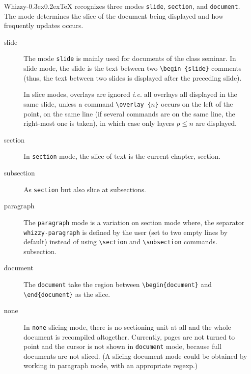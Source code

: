 \documentclass[12pt]{article}
\makeatletter
\let \lst \verb
\def \whizzy {{Whizzy\kern -0.3ex\raise 0.2ex\hbox{\let \@\relax\TeX}}}
\makeatother
\begin{document}
{\whizzy} recognizes three modes \lst"slide", \lst"section", and \lst"document". 
The mode determines the slice of the document being displayed and how
frequently updates occurs. 
\begin{description}

\item [slide]

The mode \lst"slide"  is mainly used for documents of the class seminar. 
In slide mode, the slide is the text between two \lst"\begin {slide}"
comments (thus,  the text between two slides is displayed after the
preceding slide).  

In slice modes, overlays are ignored {\em i.e.} all overlays all displayed in
the same slide, unless a command
\lst"\overlay {"$n$\lst"}" occurs on the left of the point, on the same line
(if several commands are on the same line, the 
right-most one is taken), in which case only layers $p \le n$ are displayed.

\item [section]
In \lst"section" mode, the slice of text is the current chapter, section.

\item [subsection]
As \lst"section" but also slice at subsections. 

\item [paragraph]
The \lst"paragraph" mode is a variation on section mode where, the separator
\lst"whizzy-paragraph" is defined by the user (set to two empty lines by
default) instead of using \lst"\section"  and \lst"\subsection" commands. 
subsection.

\item [document]
The \lst"document" take the region between \lst"\begin{document}"
and \lst"\end"\lst"{document}" as the slice. 

\item [none]
In \lst"none" slicing mode, there is no sectioning unit at all and
the whole document is recompiled altogether. 
Currently, pages are not turned to point and the 
cursor is not shown in \lst"document" mode, because full documents are not
sliced. (A slicing document mode could be obtained by working in paragraph
mode, with an appropriate regexp.)

\end{description}
\end{document}
